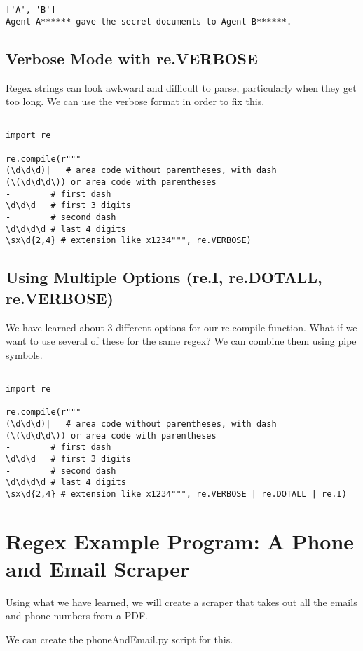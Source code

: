 \documentclass[11pt]{article}
\begin{document}
\begin{verbatim}
['A', 'B']
Agent A****** gave the secret documents to Agent B******.
\end{verbatim}

\subsection{Verbose Mode with re.VERBOSE}
\label{sec:orgfb10a38}

Regex strings can look awkward and difficult to parse, particularly when they get too long. We can use the verbose format in order to fix this.

\begin{verbatim}

import re

re.compile(r"""
(\d\d\d)|   # area code without parentheses, with dash
(\(\d\d\d\)) or area code with parentheses
-        # first dash
\d\d\d   # first 3 digits
-        # second dash
\d\d\d\d # last 4 digits
\sx\d{2,4} # extension like x1234""", re.VERBOSE)

\end{verbatim}

\subsection{Using Multiple Options (re.I, re.DOTALL, re.VERBOSE)}
\label{sec:orga4185c0}

We have learned about 3 different options for our re.compile function. What if we want to use several of these for the same regex? We can combine them using pipe symbols.

\begin{verbatim}

import re

re.compile(r"""
(\d\d\d)|   # area code without parentheses, with dash
(\(\d\d\d\)) or area code with parentheses
-        # first dash
\d\d\d   # first 3 digits
-        # second dash
\d\d\d\d # last 4 digits
\sx\d{2,4} # extension like x1234""", re.VERBOSE | re.DOTALL | re.I)

\end{verbatim}

\section{Regex Example Program: A Phone and Email Scraper}
\label{sec:org4742743}

Using what we have learned, we will create a scraper that takes out all the emails and phone numbers from a PDF.

We can create the phoneAndEmail.py script for this.
\end{document}
